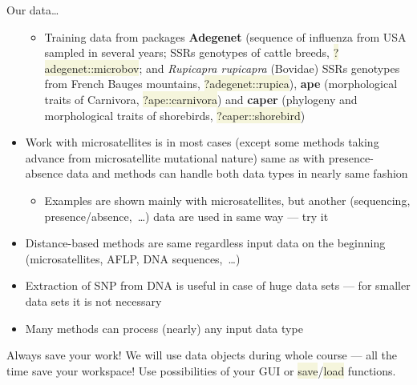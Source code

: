\documentclass[compress, ucs, xelatex, 11pt, xcolor=svgnames, aspectratio=169,
	hyperref={
		bookmarks=true,
		unicode=true,
		colorlinks=true,
		pdftitle={Molecular data in R},
		plainpages=false,
		pdfauthor={Vojtech Zeisek},
		pdfsubject={Course about phylogeny and evolution in R},
		pdfcreator={XeLaTeX},
		pdfkeywords={R, evolution, phylogeny, molecular data},
		linkcolor=Crimson, %
		anchorcolor=Magenta, %
		citecolor=Magenta, %
		filecolor=Magenta, %
		menucolor=Magenta, %
		urlcolor=DodgerBlue, %
		pdftex},
	url={hyphens, lowtilde} %
	]{beamer}
\renewcommand{\texttt}[1]{\colorbox{Beige}{{\ttfamily #1}}}
\begin{document}
\begin{frame}[allowframebreaks]{Our data\ldots}
\begin{itemize}
\begin{itemize}
			\item Training data from packages \textbf{Adegenet} (sequence of influenza from USA sampled in several years; SSRs genotypes of cattle breeds, \texttt{?adegenet::microbov}; and \textit{Rupicapra rupicapra} (Bovidae) SSRs genotypes from French Bauges mountains, \texttt{?adegenet::rupica}), \textbf{ape} (morphological traits of Carnivora, \texttt{?ape::carnivora}) and \textbf{caper} (phylogeny and morphological traits of shorebirds, \texttt{?caper::shorebird})
		\end{itemize}
		\item Work with microsatellites is in most cases (except some methods taking advance from microsatellite mutational nature) same as with presence-absence data and methods can handle both data types in nearly same fashion
		\begin{itemize}
			\item Examples are shown mainly with microsatellites, but another (sequencing, presence/absence,~\ldots) data are used in same way --- try it
		\end{itemize}
		\item Distance-based methods are same regardless input data on the beginning (microsatellites, AFLP, DNA sequences,~\ldots)
		\item Extraction of SNP from DNA is useful in case of huge data sets --- for smaller data sets it is not necessary
		\item Many methods can process (nearly) any input data type
	\end{itemize}
	\begin{alertblock}{Always save your work!}
		\alert{We will use data objects during whole course --- all the time save your workspace!} Use possibilities of your GUI or \texttt{save}/\texttt{load} functions.
	\end{alertblock}
\end{frame}
\end{document}
